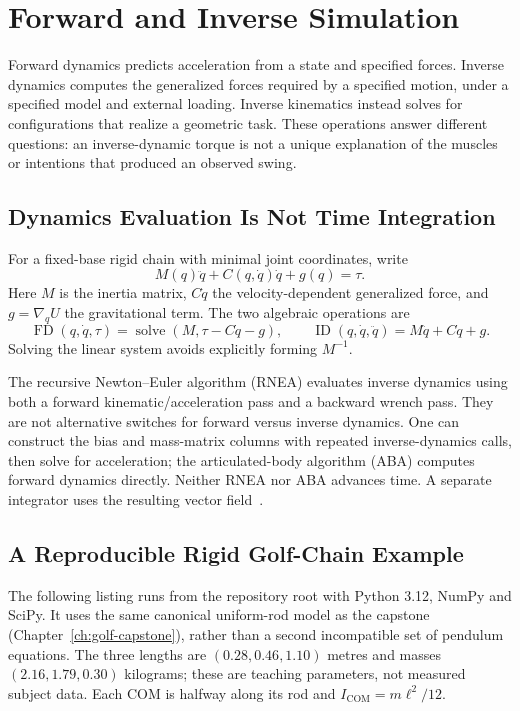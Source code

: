 \chapter{Forward and Inverse Simulation}
\label{ch:simulation}

Forward dynamics predicts acceleration from a state and specified forces. Inverse
dynamics computes the generalized forces required by a specified motion, under
a specified model and external loading. Inverse kinematics instead solves for
configurations that realize a geometric task. These operations answer different
questions: an inverse-dynamic torque is not a unique explanation of the muscles
or intentions that produced an observed swing.

\section{Dynamics Evaluation Is Not Time Integration}

For a fixed-base rigid chain with minimal joint coordinates, write
\begin{equation}
 M(q)\ddot q+C(q,\dot q)\dot q+g(q)=\tau.
 \label{eq:simulation-rigid-dynamics}
\end{equation}
Here $M$ is the inertia matrix, $C\dot q$ the velocity-dependent generalized
force, and $g=\nabla_q U$ the gravitational term. The two algebraic operations are
\[
 \operatorname{FD}(q,\dot q,\tau)
   =\operatorname{solve}(M,\tau-C\dot q-g),\qquad
 \operatorname{ID}(q,\dot q,\ddot q)=M\ddot q+C\dot q+g.
\]
Solving the linear system avoids explicitly forming $M^{-1}$.

The recursive Newton--Euler algorithm (RNEA) evaluates inverse dynamics using
both a forward kinematic/acceleration pass and a backward wrench pass. They are
not alternative switches for forward versus inverse dynamics. One can construct
the bias and mass-matrix columns with repeated inverse-dynamics calls, then
solve for acceleration; the articulated-body algorithm (ABA) computes forward
dynamics directly. Neither RNEA nor ABA advances time. A separate integrator
uses the resulting vector field~\cite{Featherstone2008,LynchParkRNEAReview}.

\section{A Reproducible Rigid Golf-Chain Example}

The following listing runs from the repository root with Python 3.12, NumPy and
SciPy. It uses the same canonical uniform-rod model as the capstone
(Chapter~\ref{ch:golf-capstone}), rather than a second incompatible set of
pendulum equations. The three lengths are $(0.28,0.46,1.10)$ metres and masses
$(2.16,1.79,0.30)$ kilograms; these are teaching parameters, not measured subject
data. Each COM is halfway along its rod and $I_{\mathrm{COM}}=m\ell^2/12$.

